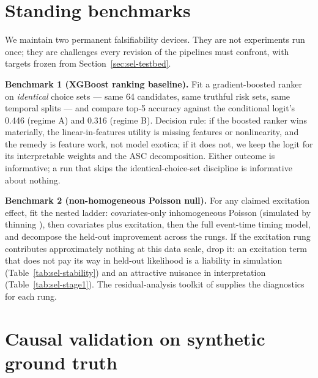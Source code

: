 \section{Standing benchmarks}
\label{sec:sel-benchmarks}

We maintain two permanent falsifiability devices. They are not experiments run once; they are challenges
every revision of the pipelines must confront, with targets frozen from Section~\ref{sec:sel-testbed}.

\textbf{Benchmark 1 (XGBoost ranking baseline).} Fit a gradient-boosted ranker \cite{chen2016} on
\emph{identical} choice sets --- same 64 candidates, same truthful risk sets, same temporal splits --- and
compare top-5 accuracy against the conditional logit's 0.446 (regime A) and 0.316 (regime B). Decision
rule: if the boosted ranker wins materially, the linear-in-features utility is missing features or
nonlinearity, and the remedy is feature work, not model exotica; if it does not, we keep the logit for its
interpretable weights and the ASC decomposition. Either outcome is informative; a run that skips the
identical-choice-set discipline is informative about nothing.

\textbf{Benchmark 2 (non-homogeneous Poisson null).} For any claimed excitation effect, fit the nested
ladder: covariates-only inhomogeneous Poisson (simulated by thinning \cite{lewis1979}), then covariates plus
excitation, then the full event-time timing model, and decompose the held-out improvement across the rungs.
If the excitation rung contributes approximately nothing at this data scale, drop it: an excitation term
that does not pay its way in held-out likelihood is a liability in simulation
(Table~\ref{tab:sel-stability}) and an attractive nuisance in interpretation (Table~\ref{tab:sel-stage1}).
The residual-analysis toolkit of \cite{ogata1988} supplies the diagnostics for each rung.

\section{Causal validation on synthetic ground truth}
\label{sec:sel-causal}

